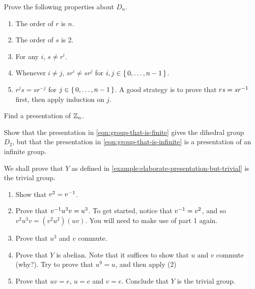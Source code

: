 \documentclass[./main.tex]{subfiles}
\begin{document}
\begin{exercise}[Properties of $D_n$]
\label{ex:basic-properties-of-dihedral-group}
    Prove the following properties about $D_n$. 
    \begin{enumerate}
        \item The order of $r$ is $n$.
        \item The order of $s$ is 2.
        \item For any $i$, $s \neq r^i$. 
        \item Whenever $i \neq j$, $sr^i \neq sr^j$ for $i, j \in \set{0, \dots, n-1}$.
        \item $r^j s = sr^{-j}$ for $j \in \set{0, \dots, n-1}$. A good strategy is to prove that $rs = sr^{-1}$
        first, then apply induction on $j$.
    \end{enumerate}
\end{exercise}

\begin{exercise}
    Find a presentation of $\mathbb{Z}_n$. 
\end{exercise}

\begin{exercise}
\label{ex:similar-presentations-but-finite-infinite}
    Show that the presentation in \cref{eqn:group-that-is-finite} gives the
    dihedral group $D_2$, but that the presentation in
    \cref{eqn:group-that-is-infinite} is a presentation of an infinite group.
\end{exercise}

\begin{exercise}
\label{ex:elaborate-presentation-but-trivial}
    We shall prove that $Y$ as defined in \cref{example:elaborate-presentation-but-trivial} is the trivial group.
    \begin{enumerate}
        \item Show that $v^2 = v^{-1}$.
        \item Prove that $v^{-1} u^3 v = u^3$. To get started, notice that $v^{-1}
        = v^2$, and so $v^2 u^3 v = (v^2 u^2) (uv)$. You will need to make use of part 1 again.
        \item Prove that $u^3$ and $v$ commute.
        \item Prove that $Y$ is abelian. Note that it suffices to show that $u$
        and $v$ commute (why?). Try to prove that $u^9 = u$, and then apply (2)
        \item Prove that $uv=e$, $u=e$ and $v=e$. Conclude that $Y$ is the
        trivial group.
    \end{enumerate}
\end{exercise}
\end{document}

